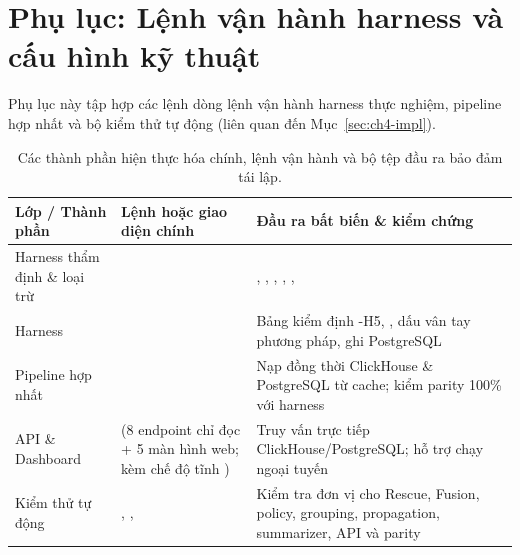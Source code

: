 
\section{Phụ lục: Lệnh vận hành harness và cấu hình kỹ thuật}
\label{app:config}

Phụ lục này tập hợp các lệnh dòng lệnh vận hành harness thực nghiệm, pipeline hợp nhất và bộ kiểm thử tự động (liên quan đến Mục~\ref{sec:ch4-impl}).

\begin{table}[H]
  \centering
  \caption{Các thành phần hiện thực hóa chính, lệnh vận hành và bộ tệp đầu ra bảo đảm tái lập.}
  \label{tab:ch4-harness}
  \tblfont
  \tblsetup
  \setlength{\tabcolsep}{4pt}
  \begin{tabularx}{\linewidth}{|>{\raggedright\arraybackslash}p{3.0cm}|Y|Y|}
    \hline
    \textbf{Lớp / Thành phần} & \textbf{Lệnh hoặc giao diện chính} & \textbf{Đầu ra bất biến \& kiểm chứng} \\
    \hline
    Harness thẩm định \& loại trừ &  & , , , , ,  \\
    \hline
    Harness  &  & Bảng kiểm định \hyp{H5}, , dấu vân tay phương pháp, ghi PostgreSQL \\
    \hline
    Pipeline hợp nhất &  & Nạp đồng thời ClickHouse \& PostgreSQL từ cache; kiểm parity 100\% với harness \\
    \hline
    API \& Dashboard &  (8 endpoint chỉ đọc + 5 màn hình web; kèm chế độ tĩnh ) & Truy vấn trực tiếp ClickHouse/PostgreSQL; hỗ trợ chạy ngoại tuyến  \\
    \hline
    Kiểm thử tự động & , ,  & Kiểm tra đơn vị cho Rescue, Fusion, policy, grouping, propagation, summarizer, API và parity \\
    \hline
  \end{tabularx}
\end{table}

